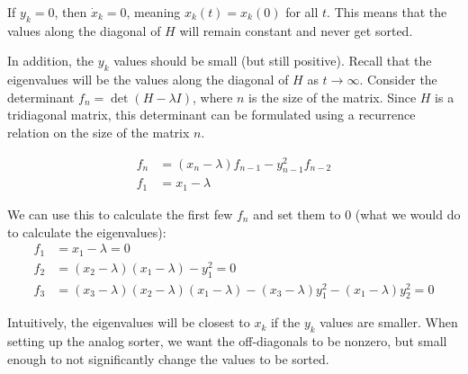 If $y_k=0$, then $\dot x_k=0$, meaning $x_k(t) = x_k(0)$ for all $t$. This means that the values along the diagonal of $H$ will remain constant and never get sorted. 

In addition, the $y_k$ values should be small (but still positive). Recall that the eigenvalues will be the values along the diagonal of $H$ as $t\rightarrow \infty$. Consider the determinant $f_n = \det (H-\lambda I)$, where $n$ is the size of the matrix. Since $H$ is a tridiagonal matrix, this determinant can be formulated using a recurrence relation on the size of the matrix $n$.

\begin{align*}
f_n &= (x_n-\lambda)f_{n-1}-y_{n-1}^2f_{n-2} \\
f_1 &= x_1-\lambda
\end{align*}

We can use this to calculate the first few $f_n$ and set them to $0$ (what we would do to calculate the eigenvalues):
\begin{align*}
f_1 &= x_1-\lambda = 0\\
f_2 &= (x_2-\lambda)(x_1-\lambda)-y_1^2 = 0\\
f_3 &= (x_3-\lambda)(x_2-\lambda)(x_1-\lambda)-(x_3-\lambda)y_1^2-(x_1-\lambda)y^2_2 = 0
\end{align*}

Intuitively, the eigenvalues will be closest to $x_k$ if the $y_k$ values are smaller. When setting up the analog sorter, we want the off-diagonals to be nonzero, but small enough to not significantly change the values to be sorted. 






%
